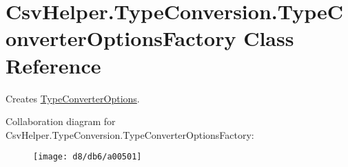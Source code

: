 \hypertarget{a00153}{\section{Csv\-Helper.\-Type\-Conversion.\-Type\-Converter\-Options\-Factory Class Reference}
\label{a00153}
}


Creates \hyperlink{a00152}{Type\-Converter\-Options}.  




Collaboration diagram for Csv\-Helper.\-Type\-Conversion.\-Type\-Converter\-Options\-Factory\-:
\nopagebreak
\begin{figure}[H]
\begin{center}
\leavevmode
\texttt{[image: d8/db6/a00501]}
\end{center}
\end{figure}

